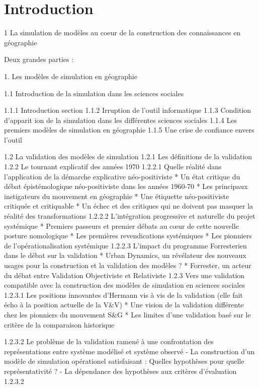 
\chapter{Introduction}

\startcontents[chapters]
\Mprintcontents


1 La simulation de modèles au coeur de la construction des connaissances en géographie

Deux grandes parties : 

1. Les modèles de simulation en géographie

1.1 Introduction de la simulation dans les sciences sociales 
	
	1.1.1 Introduction section
	1.1.2 Irruption de l'outil informatique
	1.1.3 Condition d'apparit\tabularnewline
	ion de la simulation dans les différentes sciences sociales
	1.1.4 Les premiers modèles de simulation en géographie
	1.1.5 Une crise de confiance envers l'outil

1.2 La validation des modèles de simulation
	1.2.1 Les définitions de la validation
	1.2.2 Le tournant explicatif des années 1970
		1.2.2.1 Quelle réalité dans l'application de la démarche explicative néo-positiviste
			* Un état critique du débat épistémologique néo-positiviste dans les années 1960-70
			* Les principaux instigateurs du mouvement en géographie
			* Une étiquette néo-positiviste critiquée et critiquable
			* Un échec et des critiques qui ne doivent pas masquer la réalité des transformations
		1.2.2.2 L'intégration progressive et naturelle du projet systémique
			* Premiers passeurs et premier débats au cœur de cette nouvelle posture nomologique
			* Les premières revendications systémiques
			* Les pionniers de l'opérationalisation systémique
		1.2.2.3 L'impact du programme Forresterien dans le débat sur la validation
			* Urban Dynamics, un révélateur des nouveaux usages pour la construction et la validation des modèles ?
			* Forrester, un acteur du débat entre Validation Objectiviste et Relativiste
	1.2.3 Vers une validation compatible avec la construction des modèles de simulation en sciences sociales
			1.2.3.1 Les positions innovantes d'Hermann vis à vis de la validation
				(elle fait écho à la position actuelle de la V\&V)
			* Une vision de la validation différente chez les pionniers du mouvement S\&G
			* Les limites d'une validation basé sur le critère de la comparaison historique
			
			1.2.3.2 Le problème de la validation ramené à une confrontation des représentations entre système modélisé et système observé
				- La construction d'un modèle de simulation opérationel satisfaisant : Quelles hypothèses pour quelle représentativité ? 
				- La dépendance des hypothèses aux critères d'évaluation
			1.2.3.2 
			


